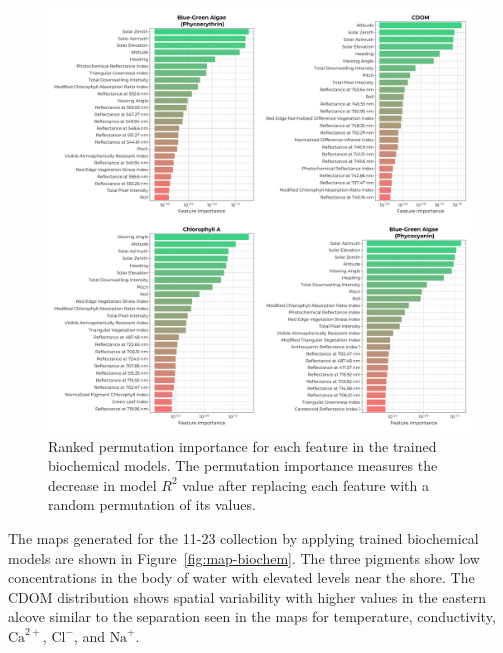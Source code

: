 \documentclass[remotesensing,article,submit,pdftex,moreauthors]{Definitions/mdpi}
\begin{document}
\begin{figure}
\centering
\includegraphics[width=\columnwidth]{paper/figures/results/fits/biochemical-ranking.pdf}
\caption{Ranked permutation importance for each feature in the trained biochemical models. The permutation importance measures the decrease in model $R^2$ value after replacing each feature with a random permutation of its values.\label{fig:biochem-fi}}
\end{figure}  

The maps generated for the 11-23 collection by applying trained biochemical models are shown in Figure~\ref{fig:map-biochem}. The three pigments show low concentrations in the body of water with elevated levels near the shore. The CDOM distribution shows spatial variability with higher values in the eastern alcove similar to the separation seen in the maps for temperature, conductivity, $\textrm{Ca}^{2+}$, $\textrm{Cl}^{-}$, and $\textrm{Na}^{+}$.
\end{document}
